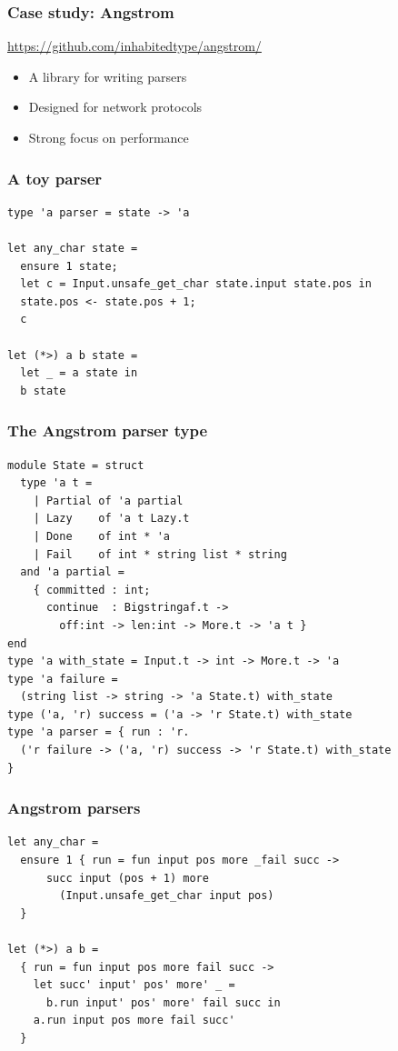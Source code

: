 \documentclass{beamer}
\begin{document}
\begin{frame}
	\frametitle{Case study: Angstrom}

	\url{https://github.com/inhabitedtype/angstrom/}
	\bigskip
	\begin{itemize}
		\item A library for writing parsers
		\item Designed for network protocols
		\item Strong focus on performance
	\end{itemize}
\end{frame}

\begin{frame}[fragile]
	\frametitle{A toy parser}
\begin{lstlisting}[style=ocaml]
type 'a parser = state -> 'a

let any_char state =
  ensure 1 state;
  let c = Input.unsafe_get_char state.input state.pos in
  state.pos <- state.pos + 1;
  c

let (*>) a b state =
  let _ = a state in
  b state
\end{lstlisting}
\end{frame}

\begin{frame}[fragile]
	\frametitle{The Angstrom parser type}
\begin{lstlisting}[style=ocaml,basicstyle=\ttfamily\small]
module State = struct
  type 'a t =
    | Partial of 'a partial
    | Lazy    of 'a t Lazy.t
    | Done    of int * 'a
    | Fail    of int * string list * string
  and 'a partial =
    { committed : int;
      continue  : Bigstringaf.t ->
        off:int -> len:int -> More.t -> 'a t }
end
type 'a with_state = Input.t -> int -> More.t -> 'a
type 'a failure =
  (string list -> string -> 'a State.t) with_state
type ('a, 'r) success = ('a -> 'r State.t) with_state
type 'a parser = { run : 'r.
  ('r failure -> ('a, 'r) success -> 'r State.t) with_state
}
\end{lstlisting}
\end{frame}

\begin{frame}[fragile]
	\frametitle{Angstrom parsers}
\begin{lstlisting}[style=ocaml,basicstyle=\ttfamily\small]
let any_char =
  ensure 1 { run = fun input pos more _fail succ ->
      succ input (pos + 1) more
        (Input.unsafe_get_char input pos)
  }

let (*>) a b =
  { run = fun input pos more fail succ ->
    let succ' input' pos' more' _ =
      b.run input' pos' more' fail succ in
    a.run input pos more fail succ'
  }
\end{lstlisting}
\end{frame}
\end{document}
